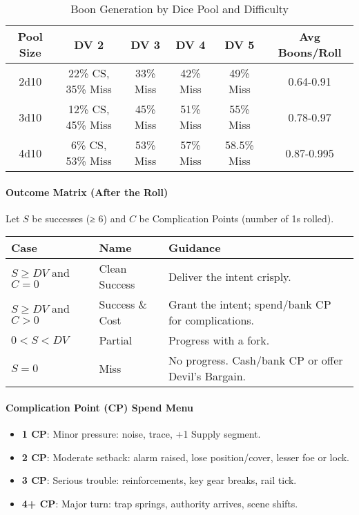 \documentclass[11pt]{article}
\begin{document}
\begin{table}[htbp]
\centering
\caption{Boon Generation by Dice Pool and Difficulty}
\begin{tabular}{|c|c|c|c|c|c|}
\hline
\textbf{Pool Size} & \textbf{DV 2} & \textbf{DV 3} & \textbf{DV 4} & \textbf{DV 5} & \textbf{Avg Boons/Roll} \\
\hline
2d10 & 22\% CS, 35\% Miss & 33\% Miss & 42\% Miss & 49\% Miss & 0.64-0.91 \\
3d10 & 12\% CS, 45\% Miss & 45\% Miss & 51\% Miss & 55\% Miss & 0.78-0.97 \\
4d10 & 6\% CS, 53\% Miss & 53\% Miss & 57\% Miss & 58.5\% Miss & 0.87-0.995 \\
\hline
\end{tabular}
\end{table}

\paragraph{Outcome Matrix (After the Roll)}
Let $S$ be successes (≥ 6) and $C$ be Complication Points (number of 1s rolled).
\begin{center}
\begin{tabular}{lll}
\toprule
\textbf{Case} & \textbf{Name} & \textbf{Guidance} \\
\midrule
$S \geq DV$ and $C = 0$ & Clean Success & Deliver the intent crisply. \\
$S \geq DV$ and $C > 0$ & Success \& Cost & Grant the intent; spend/bank CP for complications. \\
$0 < S < DV$ & Partial & Progress with a fork. \\
$S = 0$ & Miss & No progress. Cash/bank CP or offer Devil's Bargain. \\
\bottomrule
\end{tabular}
\end{center}

\paragraph{Complication Point (CP) Spend Menu}
\begin{itemize}
    \item \textbf{1 CP}: Minor pressure: noise, trace, +1 Supply segment.
    \item \textbf{2 CP}: Moderate setback: alarm raised, lose position/cover, lesser foe or lock.
    \item \textbf{3 CP}: Serious trouble: reinforcements, key gear breaks, rail tick.
    \item \textbf{4+ CP}: Major turn: trap springs, authority arrives, scene shifts.
\end{itemize}
\end{document}
